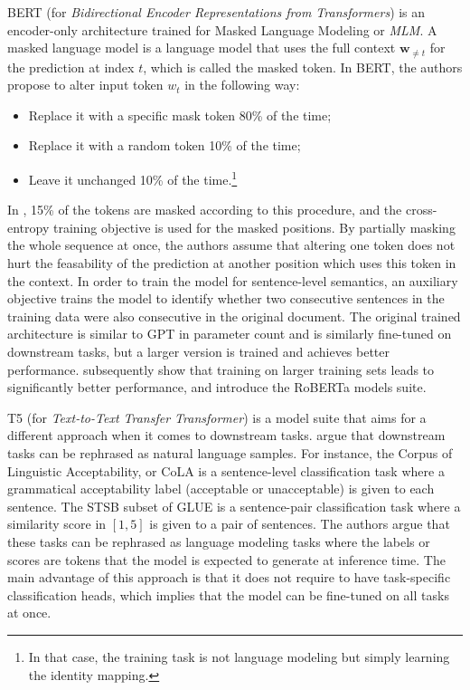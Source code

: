 BERT (for \textit{Bidirectional Encoder Representations from Transformers}) is an encoder-only architecture trained for Masked Language Modeling or \textit{MLM}. A masked language model is a language model that uses the full context $\mathbf{w}_{\neq t}$ for the prediction at index $t$, which is called the masked token. In BERT, the authors propose to alter input token $w_t$ in the following way:
\begin{itemize}
    \item Replace it with a specific mask token 80\% of the time;
    \item Replace it with a random token 10\% of the time;
    \item Leave it unchanged 10\% of the time.\footnote{In that case, the training task is not language modeling but simply learning the identity mapping.}
\end{itemize}

In \citet{devlin-etal-2019-bert}, 15\% of the tokens are masked according to this procedure, and the cross-entropy training objective is used for the masked positions. By partially masking the whole sequence at once, the authors assume that altering one token does not hurt the feasability of the prediction at another position which uses this token in the context. In order to train the model for sentence-level semantics, an auxiliary objective trains the model to identify whether two consecutive sentences in the training data were also consecutive in the original document.
The original trained architecture is similar to GPT in parameter count and is similarly fine-tuned on downstream tasks, but a larger version is trained and achieves better performance. \citet{roberta} subsequently show that training on larger training sets leads to significantly better performance, and introduce the RoBERTa models suite.

T5 (for \textit{Text-to-Text Transfer Transformer}) is a model suite that aims for a different approach when it comes to downstream tasks. \citet{2020t5} argue that downstream tasks can be rephrased as natural language samples. For instance, the Corpus of Linguistic Acceptability, or CoLA \citep{warstadt2018neural} is a sentence-level classification task where a grammatical acceptability label (acceptable or unacceptable) is given to each sentence. The STSB subset of GLUE \citep{wang-etal-2018-glue} is a sentence-pair classification task where a similarity score in $[1, 5]$ is given to a pair of sentences. The authors argue that these tasks can be rephrased as language modeling tasks where the labels or scores are tokens that the model is expected to generate at inference time. The main advantage of this approach is that it does not require to have task-specific classification heads, which implies that the model can be fine-tuned on all tasks at once.

